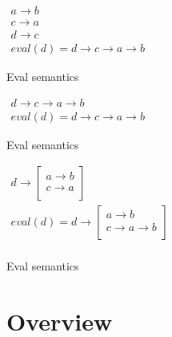\documentclass[11pt]{article}
\begin{document}
\begin{example}[H]
$
  \begin{array}{l}
    a \rightarrow b \\
    c \rightarrow a \\
    d \rightarrow c \\
    eval(d) = d \rightarrow c \rightarrow a \rightarrow b
  \end{array}
$
\caption{Eval semantics}
\end{example}

\begin{example}[H]
$
  \begin{array}{l}
    d \rightarrow c \rightarrow a \rightarrow b \\
    eval(d) = d \rightarrow c \rightarrow a \rightarrow b
  \end{array}
$
\caption{Eval semantics}
\end{example}

\begin{example}[H]
$
  \begin{array}{l}
    d \rightarrow
    \left [ \begin{array}{l}
      a \rightarrow b \\
      c \rightarrow a \\
    \end{array} \right ] \\
    eval(d) = d \rightarrow 
    \left [ \begin{array}{l}
      a \rightarrow b \\
      c \rightarrow a \rightarrow b \\
    \end{array} \right ] \\
  \end{array}
$
\caption{Eval semantics}
\end{example}

\section{Overview}

\begin{comment}
In the initial sections of this paper we will ignore certain existing. In the final sections a comparison with the existing theories is provided.

\subsection{Concepts}

\begin{itemize}
\item Curry-Howard correspondence: Once one starts investigating, similar correspondences can be found in a very wide range of programming concepts.
\end{itemize}

\end{comment}
\end{document}
